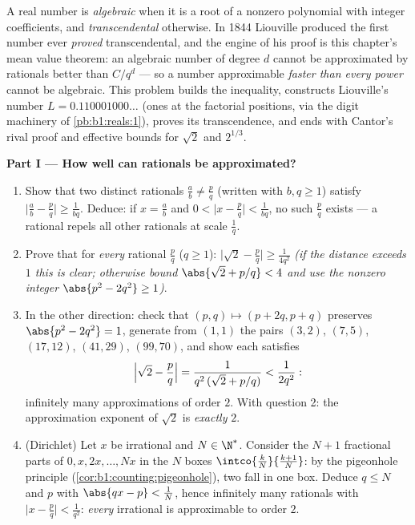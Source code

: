 \begin{problem}
\label{pb:b1:derivative:1}
A real number is \emph{algebraic} when it is a root of a nonzero
polynomial with integer coefficients, and \emph{transcendental}
otherwise. In 1844 Liouville produced the first number ever
\emph{proved} transcendental, and the engine of his proof is this
chapter's mean value theorem: an algebraic number of degree $d$
cannot be approximated by rationals better than $C/q^d$ --- so a
number approximable \emph{faster than every power} cannot be
algebraic. This problem builds the inequality, constructs
Liouville's number $L = 0.110001000\dots$ (ones at the factorial
positions, via the digit machinery of \cref{pb:b1:reals:1}),
proves its transcendence, and ends with Cantor's rival proof and
effective bounds for $\sqrt2$ and
$2^{1/3}$.

\medskip
\noindent\textbf{Part I --- How well can rationals be
approximated?}
\begin{enumerate}
  \item Show that two distinct rationals $\frac ab \neq \frac pq$
        (written with $b, q \geq 1$) satisfy $\bigl|\frac ab -
        \frac pq\bigr| \geq \frac{1}{bq}$. Deduce: if $x =
        \frac ab$ and $0 < \bigl|x - \frac pq\bigr| <
        \frac{1}{bq}$, no such $\frac pq$ exists --- a rational
        repels all other rationals at scale $\frac 1q$.
  \item Prove that for \emph{every} rational $\frac pq$ ($q \geq
        1$): $\bigl|\sqrt2 - \frac pq\bigr| \geq
        \frac{1}{4q^2}$ \emph{(if the distance exceeds $1$ this
        is clear; otherwise bound $\abs{\sqrt2 + p/q} < 4$ and
        use the nonzero integer $\abs{p^2 - 2q^2} \geq 1$)}.
  \item In the other direction: check that $(p, q) \mapsto (p +
        2q, p + q)$ preserves $\abs{p^2 - 2q^2} = 1$, generate
        from $(1,1)$ the pairs $(3,2)$, $(7,5)$, $(17,12)$,
        $(41,29)$, $(99,70)$, and show each satisfies
        \[
        \Bigl|\sqrt2 - \frac pq\Bigr| =
        \frac{1}{q^2\,(\sqrt2 + p/q)} < \frac{1}{2q^2} :
        \]
        infinitely many approximations of order $2$. With
        question 2: the approximation exponent of $\sqrt 2$ is
        \emph{exactly} $2$.
  \item (Dirichlet) Let $x$ be irrational and $N \in \N^*$.
        Consider the $N + 1$ fractional parts of $0, x, 2x,
        \dots, Nx$ in the $N$ boxes $\intco{\frac kN}{\frac{k +
        1}{N}}$: by the pigeonhole principle
        (\cref{cor:b1:counting:pigeonhole}), two fall in one box.
        Deduce $q \leq N$ and $p$ with $\abs{qx - p} <
        \frac 1N$, hence infinitely many rationals with
        $\bigl|x - \frac pq\bigr| < \frac{1}{q^2}$: \emph{every}
        irrational is approximable to order $2$.
\end{enumerate}


\end{problem}
